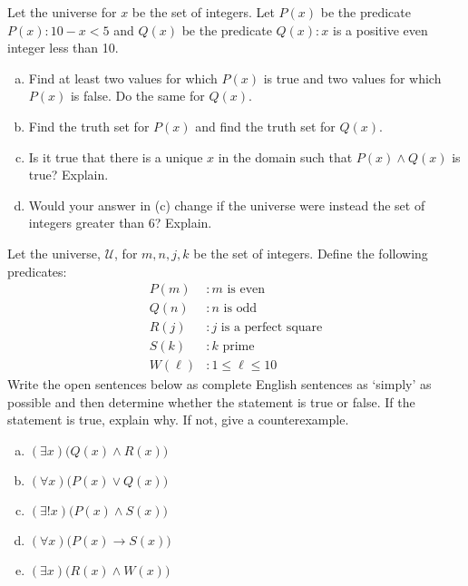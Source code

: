 \documentclass[11pt,letterpaper]{article}
\begin{document}

 Let the universe for $x$ be the set of integers. Let $P(x)$ be the predicate $P(x) \colon 10 - x < 5$ and $Q(x)$ be the predicate $Q(x) \colon x$ is a positive even integer less than 10.
	\begin{enumerate}[(a)]
	\item Find at least two values for which $P(x)$ is true and two values for which $P(x)$ is false. Do the same for $Q(x)$. 
	\item Find the truth set for $P(x)$ and find the truth set for $Q(x)$.
	\item Is it true that there is a unique $x$ in the domain such that $P(x) \wedge Q(x)$ is true? Explain.
	\item Would your answer in (c) change if the universe were instead the set of integers greater than 6? Explain. 
	\end{enumerate} 
	
	

\newpage



 Let the universe, $\mathcal{U}$, for $m, n, j, k$ be the set of integers. Define the following predicates:
	\[
	\begin{aligned}
	P(m) &\colon m \text{ is even} \\
	Q(n) &\colon n \text{ is odd} \\
	R(j) &\colon j \text{ is a perfect square} \\
	S(k) &\colon k \text{ prime} \\
	W(\ell) &\colon 1 \leq \ell \leq 10
	\end{aligned}
	\]
Write the open sentences below as complete English sentences as `simply' as possible and then determine whether the statement is true or false. If the statement is true, explain why. If not, give a counterexample. 
	\begin{enumerate}[(a)]
	\item $(\exists x) \big( Q(x) \wedge R(x) \big)$
	\item $(\forall x) \big( P(x) \vee Q(x) \big)$
	\item $(\exists! x) \big( P(x) \wedge S(x) \big)$
	\item $(\forall x) \big( P(x) \to S(x) \big)$
	\item $(\exists x) \big(R(x) \wedge W(x) \big)$
	\end{enumerate} 
\end{document}
